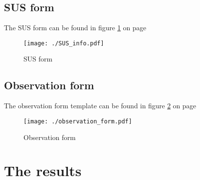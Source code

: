 	     	\subsection{SUS form}
			The SUS form can be found in figure \ref{fig:SUS_form} on page \pageref{fig:SUS_form}
			\begin{figure}[htp]{
			\texttt{[image: ./SUS\_info.pdf]}}
			\caption{SUS form}\label{fig:SUS_form}
			\end{figure}
		\subsection{Observation form}
			The observation form template can be found in figure \ref{fig:observation_form} on page \pageref{fig:observation_form}
			\begin{figure}[htp]{
			\texttt{[image: ./observation\_form.pdf]}}
			\caption{Observation form}\label{fig:observation_form}
			\end{figure}

	\section{The results}
	